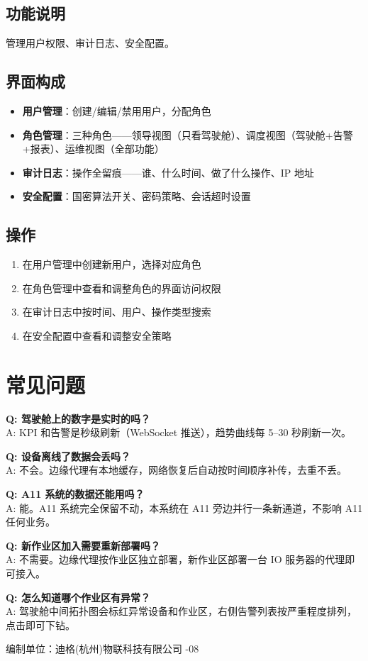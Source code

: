 \documentclass[11pt,a4paper]{ctexart}
\begin{document}
\subsection{功能说明}
管理用户权限、审计日志、安全配置。

\subsection{界面构成}
\begin{itemize}[leftmargin=*]
  \item \textbf{用户管理}：创建/编辑/禁用用户，分配角色
  \item \textbf{角色管理}：三种角色——领导视图（只看驾驶舱）、调度视图（驾驶舱+告警+报表）、运维视图（全部功能）
  \item \textbf{审计日志}：操作全留痕——谁、什么时间、做了什么操作、IP 地址
  \item \textbf{安全配置}：国密算法开关、密码策略、会话超时设置
\end{itemize}

\subsection{操作}
\begin{enumerate}[leftmargin=*]
  \item 在用户管理中创建新用户，选择对应角色
  \item 在角色管理中查看和调整角色的界面访问权限
  \item 在审计日志中按时间、用户、操作类型搜索
  \item 在安全配置中查看和调整安全策略
\end{enumerate}

\section{常见问题}

\textbf{Q: 驾驶舱上的数字是实时的吗？}\\
A: KPI 和告警是秒级刷新（WebSocket 推送），趋势曲线每 5--30 秒刷新一次。

\textbf{Q: 设备离线了数据会丢吗？}\\
A: 不会。边缘代理有本地缓存，网络恢复后自动按时间顺序补传，去重不丢。

\textbf{Q: A11 系统的数据还能用吗？}\\
A: 能。A11 系统完全保留不动，本系统在 A11 旁边并行一条新通道，不影响 A11 任何业务。

\textbf{Q: 新作业区加入需要重新部署吗？}\\
A: 不需要。边缘代理按作业区独立部署，新作业区部署一台 IO 服务器的代理即可接入。

\textbf{Q: 怎么知道哪个作业区有异常？}\\
A: 驾驶舱中间拓扑图会标红异常设备和作业区，右侧告警列表按严重程度排列，点击即可下钻。

\vspace{1em}\noindent\hrulefill
\begin{center}\small
编制单位：迪格(杭州)物联科技有限公司 -08
\end{center}
\end{document}
